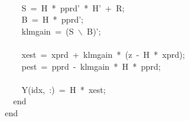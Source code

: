 \documentclass{article}\usepackage[]{graphicx}\usepackage[]{xcolor}
\makeatletter
\newcommand{\hlsng}[1]{\textcolor[rgb]{0.863,0.196,0.184}{#1}}%
\newcommand{\hlopt}[1]{\textcolor[rgb]{0.576,0.631,0.631}{#1}}%
\newcommand{\hldef}[1]{\textcolor[rgb]{0.514,0.58,0.588}{#1}}%
\newcommand{\hlkwa}[1]{\textcolor[rgb]{0.796,0.294,0.086}{#1}}%
\newenvironment{kframe}{%
 \def\at@end@of@kframe{}%
 \ifinner\ifhmode%
  \def\at@end@of@kframe{\end{minipage}}%
  \begin{minipage}{\columnwidth}%
 \fi\fi%
 \def\FrameCommand##1{\hskip\@totalleftmargin \hskip-\fboxsep
 \colorbox{shadecolor}{##1}\hskip-\fboxsep
     \hskip-\linewidth \hskip-\@totalleftmargin \hskip\columnwidth}%
 \MakeFramed {\advance\hsize-\width
   \@totalleftmargin\z@ \linewidth\hsize
   \@setminipage}}%
 {\par\unskip\endMakeFramed%
 \at@end@of@kframe}
\newenvironment{knitrout}{}{} %
\makeatother
\begin{document}
\begin{knitrout}
\begin{kframe}
\hldef{}\hldef{\ \ \ \ }\hldef{}\hspace*{\fill}\\
\hldef{}\hldef{\ \ \ \ }\hldef{S\ }\hlopt{=\ }\hldef{H\ }\hlopt{{*}\ }\hldef{p\textunderscore prd}\hlsng{'\ {*}\ H'}\hldef{\ }\hlopt{+\ }\hldef{R}\hlopt{;}\hspace*{\fill}\\
\hldef{}\hldef{\ \ \ \ }\hldef{B\ }\hlopt{=\ }\hldef{H\ }\hlopt{{*}\ }\hldef{p\textunderscore prd'}\hlopt{;}\hspace*{\fill}\\
\hldef{}\hldef{\ \ \ \ }\hldef{klm\textunderscore gain\ }\hlopt{=\ (}\hldef{S\ $\backslash$\ B}\hlopt{)}\hldef{'}\hlopt{;}\hspace*{\fill}\\
\hldef{}\hldef{\ \ \ \ }\hldef{}\hspace*{\fill}\\
\hldef{}\hldef{\ \ \ \ }\hldef{x\textunderscore est\ }\hlopt{=\ }\hldef{x\textunderscore prd\ }\hlopt{+\ }\hldef{klm\textunderscore gain\ }\hlopt{{*}\ (}\hldef{z\ }\hlopt{{-}\ }\hldef{H\ }\hlopt{{*}\ }\hldef{x\textunderscore prd}\hlopt{);}\hspace*{\fill}\\
\hldef{}\hldef{\ \ \ \ }\hldef{p\textunderscore est\ }\hlopt{=\ }\hldef{p\textunderscore prd\ }\hlopt{{-}\ }\hldef{klm\textunderscore gain\ }\hlopt{{*}\ }\hldef{H\ }\hlopt{{*}\ }\hldef{p\textunderscore prd}\hlopt{;}\hspace*{\fill}\\
\hldef{}\hldef{\ \ \ \ }\hldef{}\hspace*{\fill}\\
\hldef{}\hldef{\ \ \ \ }\hldef{Y}\hlopt{(}\hldef{idx}\hlopt{,\ :)\ =\ }\hldef{H\ }\hlopt{{*}\ }\hldef{x\textunderscore est}\hlopt{;}\hspace*{\fill}\\
\hldef{}\hldef{\ \ }\hldef{}\hlkwa{end}\hldef{\ \ \ \ \ \ \ \ \ \ \ \ \ \ \ \ }\hlkwa{}\hldef{}\hspace*{\fill}\\
\hldef{}\hlkwa{end}\hldef{\ \ \ }\hlkwa{}\hldef{}\hldef{}\hspace*{\fill}
\mbox{}
\normalfont
\normalsize
\end{kframe}
\end{knitrout}
\end{document}
